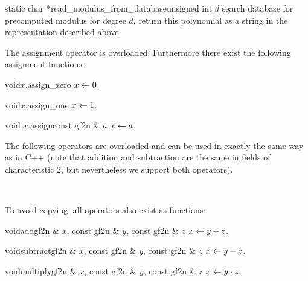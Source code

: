 \begin{Tfcode}{static char *}{read_modulus_from_database}{unsigned int $d$}
  search database for precomputed modulus for degree $d$, return this polynomial as a string in
  the representation described above.
\end{Tfcode}



\ASGN

The assignment operator \code{=} is overloaded.  Furthermore there exist the following
assignment functions:

\begin{fcode}{void}{$x$.assign_zero}{}
  $x \leftarrow 0$.
\end{fcode}

\begin{fcode}{void}{$x$.assign_one}{}
  $x \leftarrow 1$.
\end{fcode}

\begin{fcode}{void}{ $x$.assign}{const gf2n & $a$}
  $x \leftarrow a$.
\end{fcode}



\ARTH

The following operators are overloaded and can be used in exactly the same way as in C++ (note
that addition and subtraction are the same in fields of characteristic 2, but nevertheless we
support both operators).

\begin{center}
   \\
\end{center}

To avoid copying, all operators also exist as functions:

\begin{fcode}{void}{add}{gf2n & $x$, const gf2n & $y$, const gf2n & $z$}
  $x \leftarrow y + z$.
\end{fcode}

\begin{fcode}{void}{subtract}{gf2n & $x$, const gf2n & $y$, const gf2n & $z$}
  $x \leftarrow y - z$.
\end{fcode}

\begin{fcode}{void}{multiply}{gf2n & $x$, const gf2n & $y$, const gf2n & $z$}
  $x \leftarrow y \cdot z$.
\end{fcode}


